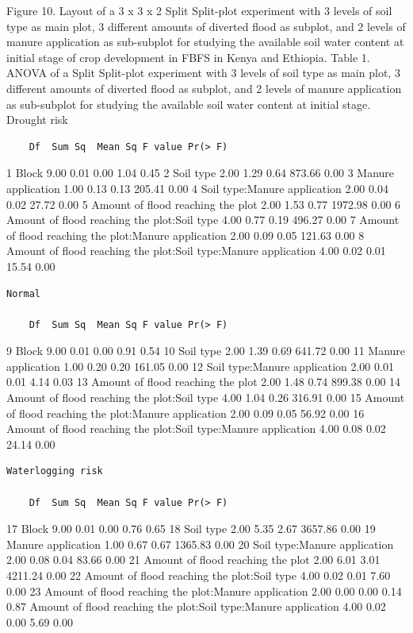 \documentclass[12pt,oneside]{article}
\begin{document}
Figure 10. Layout of a 3 x 3 x 2 Split Split-plot experiment with 3 levels of soil type as main plot, 3 different amounts of diverted flood as subplot, and 2 levels of manure application as sub-subplot for studying the available soil water content at initial stage of crop development in FBFS in Kenya and Ethiopia.
Table 1. ANOVA of a Split Split-plot experiment with 3 levels of soil type as main plot, 3 different amounts of diverted flood as subplot, and 2 levels of manure application as sub-subplot for studying the available soil water content at initial stage.
Drought risk

\begin{verbatim}
    Df  Sum Sq  Mean Sq F value Pr(> F)
\end{verbatim}

1 Block 9.00 0.01 0.00 1.04 0.45
2 Soil type 2.00 1.29 0.64 873.66 0.00
3 Manure application 1.00 0.13 0.13 205.41 0.00
4 Soil type:Manure application 2.00 0.04 0.02 27.72 0.00
5 Amount of flood reaching the plot 2.00 1.53 0.77 1972.98 0.00
6 Amount of flood reaching the plot:Soil type 4.00 0.77 0.19 496.27 0.00
7 Amount of flood reaching the plot:Manure application 2.00 0.09 0.05 121.63 0.00
8 Amount of flood reaching the plot:Soil type:Manure application 4.00 0.02 0.01 15.54 0.00

\begin{verbatim}
Normal

    Df  Sum Sq  Mean Sq F value Pr(> F)
\end{verbatim}

9 Block 9.00 0.01 0.00 0.91 0.54
10 Soil type 2.00 1.39 0.69 641.72 0.00
11 Manure application 1.00 0.20 0.20 161.05 0.00
12 Soil type:Manure application 2.00 0.01 0.01 4.14 0.03
13 Amount of flood reaching the plot 2.00 1.48 0.74 899.38 0.00
14 Amount of flood reaching the plot:Soil type 4.00 1.04 0.26 316.91 0.00
15 Amount of flood reaching the plot:Manure application 2.00 0.09 0.05 56.92 0.00
16 Amount of flood reaching the plot:Soil type:Manure application 4.00 0.08 0.02 24.14 0.00

\begin{verbatim}
Waterlogging risk

    Df  Sum Sq  Mean Sq F value Pr(> F)
\end{verbatim}

17 Block 9.00 0.01 0.00 0.76 0.65
18 Soil type 2.00 5.35 2.67 3657.86 0.00
19 Manure application 1.00 0.67 0.67 1365.83 0.00
20 Soil type:Manure application 2.00 0.08 0.04 83.66 0.00
21 Amount of flood reaching the plot 2.00 6.01 3.01 4211.24 0.00
22 Amount of flood reaching the plot:Soil type 4.00 0.02 0.01 7.60 0.00
23 Amount of flood reaching the plot:Manure application 2.00 0.00 0.00 0.14 0.87
Amount of flood reaching the plot:Soil type:Manure application 4.00 0.02 0.00 5.69 0.00
\end{document}
